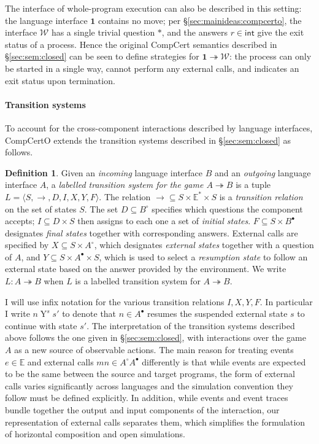 \documentclass[11pt,oneside]{book}
\theoremstyle{definition}
\newtheorem{definition}[theorem]{Definition}
\newcommand{\kw}[1]{\ensuremath{ \mathsf{#1} }}
\newcommand{\que}{\circ}         %
\newcommand{\ans}{\bullet}       %
\begin{document}
The interface of whole-program execution
can also be described in this setting:
the language interface $\mathbf{1}$ contains no move;
per \S\ref{sec:mainideas:compcerto},
the interface $\mathcal{W}$ has a single trivial question $*$,
and the answers $r \in \kw{int}$
give the exit status of a process.
Hence the original CompCert semantics described in
\S\ref{sec:sem:closed}
can be seen to define strategies for
$\mathbf{1} \twoheadrightarrow \mathcal{W}$:
the process can only be started in a single way,
cannot perform any external calls,
and indicates an exit status upon termination.


\paragraph{Transition systems} %

To account for the cross-component interactions
described by language interfaces,
CompCertO extends
the transition systems described in \S\ref{sec:sem:closed}
as follows.

\begin{definition} \label{def:lts}
Given an \emph{incoming} language interface $B$
and an \emph{outgoing} language interface $A$,
a \emph{labelled transition system for the game $A \twoheadrightarrow B$}
is a tuple $L = \langle S, \rightarrow, D, I, X, Y, F \rangle$.
The relation
${\rightarrow} \subseteq S \times \mathbb{E}^* \times S$ is
a \emph{transition relation} on the set of states $S$.
The set $D \subseteq B^\que$ specifies which
questions the component accepts;
$I \subseteq D \times S$ then
assigns to each one a set of \emph{initial states}.
$F \subseteq S \times B^\ans$
designates \emph{final states} together with corresponding answers.
External calls are specified by
$X \subseteq S \times A^\que$,
which designates \emph{external states} together with
a question of $A$, and
$Y \subseteq S \times A^\ans \times S$,
which is used to select a \emph{resumption state}
to follow an external state
based on the answer provided by the environment.
We write $L : A \twoheadrightarrow B$ when
$L$ is a labelled transition system for $A \twoheadrightarrow B$.
\end{definition}

I will use infix notation for the various transition relations
$I, X, Y, F$.
In particular I write $n \mathrel{Y}^s s'$
to denote that $n \in A^\ans$
resumes the suspended external state $s$
to continue with state $s'$.
The interpretation of the
transition systems described above
follows the one given in \S\ref{sec:sem:closed},
with interactions over the game $A$
as a new source of observable actions.
The main reason for treating
events $e \in \mathbb{E}$ and
external calls $m n \in A^\que A^\ans$
differently is that
while events are expected to be the same
between the source and target programs,
the form of external calls varies significantly
across languages
and the simulation convention they follow
must be defined explicitly.
In addition,
while events and event traces
bundle together the output and input
components of the interaction,
our representation of external calls
separates them,
which simplifies the formulation of
horizontal composition and open simulations.
\end{document}
